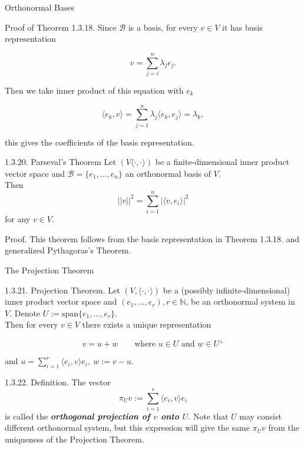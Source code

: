\documentclass[hyperref={pdfpagelabels=true}]{beamer}
\newcommand{\N}{\mathbb{N}}
\newcommand{\highlightg}[1]{\textcolor[rgb]{0.1,0.5,0.3}{\emph{\textbf{#1}}}}
\newcommand{\<}{\langle}
\renewcommand{\>}{\rangle}
\begin{document}
\begin{frame}{Orthonormal Bases}
    \begin{block}{Proof of Theorem 1.3.18.}
        Since $\mathcal{B}$ is a basis, for every $v \in V$ it has basis representation
        \begin{spacing}{0.7}
        \[v = \sum_{j = i}^{n}\lambda_{j}e_{j}.\]
        \end{spacing}
        Then we take inner product of this equation with $e_{k}$
        \begin{spacing}{0.7}
        \[\<e_{k},v\> = \sum_{j = 1}^{n}\lambda_{j}\<e_{k},e_j\> = \lambda_{k},\]
        \end{spacing}
        this gives the coefficients of the basis representation.
    \end{block}
    \begin{block}{1.3.20. Parseval's Theorem}
        Let $(V\<\cdot,\cdot\>)$ be a finite-dimensional inner product vector space and $\mathcal{B} = \{e_{1},...,e_{n}\}$ an orthonormal basis of $V$.\\
        Then 
        \[||v||^{2} = \sum_{i = 1}^{n}|\<v,e_{i}\>|^{2}\]
        for any $v \in V$.
    \end{block}
    \begin{block}{Proof.}
        This theorem follows from the basis representation in Theorem 1.3.18. and generalized Pythagoras's Theorem.
    \end{block}
\end{frame}
\begin{frame}{The Projection Theorem}
    \begin{block}{1.3.21. Projection Theorem.}
        Let $(V,\<\cdot,\cdot\>)$ be a (possibly infinite-dimensional) inner product vector space and $(e_{1},...,e_{r}),r \in \N$, be an orthonormal system in $V$. Denote $U:=\text{span}\{e_{1},...,e_{r}\}$.\\
        Then for every $v \in V$ there exists a unique representation
        \begin{spacing}{0.8}
        \[v = u+w \qquad \text{where }u \in U \text{ and } w \in U^{\bot}\]
        \end{spacing}
        and $u = \sum \limits_{i = 1}^{r}\<e_{i},v\>e_{i},\ w:= v-u.$
    \end{block}
    \begin{block}{1.3.22. Definition.}
        The vector
        \[\pi_{U}v:=\sum_{i = 1}^{r}\<e_{i},v\>e_{i}\]
        is called the 
        \highlightg{orthogonal projection of $v$ onto $U$}. Note that $U$ may consist different orthonormal system, but this expression will give the same $\pi_{U}v$ from the uniqueness of the Projection Theorem.
    \end{block}
\end{frame}
\end{document}
